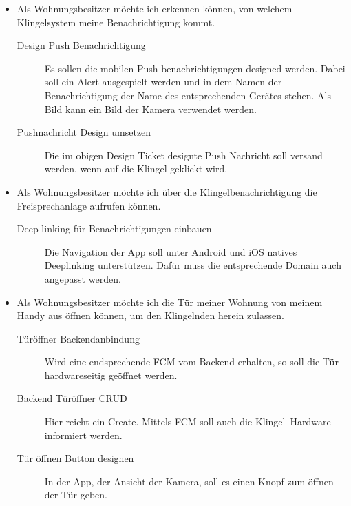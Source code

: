 \begin{itemize}
    \item Als Wohnungsbesitzer möchte ich erkennen können, von welchem Klingelsystem meine Benachrichtigung kommt.
        \begin{description}
            \item[Design Push Benachrichtigung] Es sollen die mobilen Push benachrichtigungen designed werden.
                Dabei soll ein Alert ausgespielt werden und in dem Namen der Benachrichtigung der Name des entsprechenden Gerätes stehen.
                Als Bild kann ein Bild der Kamera verwendet werden.
            \item[Pushnachricht Design umsetzen] Die im obigen Design Ticket designte Push Nachricht soll versand werden, wenn auf die Klingel geklickt wird.
        \end{description}
    \item Als Wohnungsbesitzer möchte ich über die Klingelbenachrichtigung die Freisprechanlage aufrufen können.
        \begin{description}
            \item[Deep-linking für Benachrichtigungen einbauen] Die Navigation der App soll unter Android und iOS natives Deeplinking unterstützen.
                Dafür muss die entsprechende Domain auch angepasst werden.
        \end{description}
    \item Als Wohnungsbesitzer möchte ich die Tür meiner Wohnung von meinem Handy aus öffnen können, um den Klingelnden herein zulassen.
        \begin{description}
            \item[Türöffner Backendanbindung] Wird eine endsprechende FCM vom Backend erhalten, so soll die Tür hardwareseitig geöffnet werden.
            \item[Backend Türöffner CRUD] Hier reicht ein Create.
                Mittels FCM soll auch die Klingel--Hardware informiert werden.
            \item[Tür öffnen Button designen] In der App, der Ansicht der Kamera, soll es einen Knopf zum öffnen der Tür geben.

\end{description}
\end{itemize}
